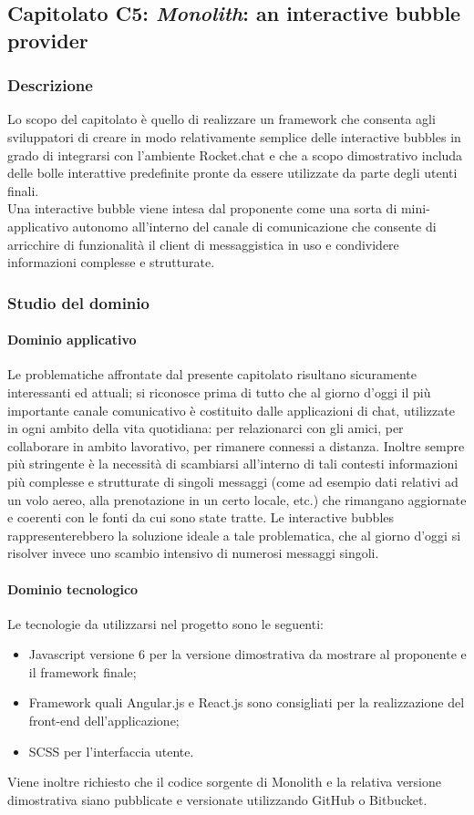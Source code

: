 	\subsection{Capitolato C5: \emph{Monolith}: an interactive bubble provider}
		\subsubsection{Descrizione}
		Lo scopo del capitolato è quello di realizzare un framework che consenta agli sviluppatori di creare in modo relativamente semplice delle 
		interactive bubbles in grado di integrarsi con l'ambiente Rocket.chat e che a scopo dimostrativo includa delle bolle interattive predefinite 
		pronte da essere utilizzate da parte degli utenti finali.
		\\Una interactive bubble viene intesa dal proponente come una sorta di mini-applicativo autonomo all'interno del canale di comunicazione 
		che consente di arricchire di funzionalità il client di messaggistica in uso e condividere informazioni complesse e strutturate.

		\subsubsection{Studio del dominio}
			\paragraph{Dominio applicativo}
			Le problematiche affrontate dal presente capitolato risultano sicuramente interessanti ed attuali; si riconosce prima di tutto che al 
			giorno d'oggi il più importante canale comunicativo è costituito dalle applicazioni di chat, utilizzate in ogni ambito della vita 
			quotidiana: per relazionarci con gli amici, per collaborare in ambito lavorativo, per rimanere connessi a distanza. Inoltre sempre 
			più stringente è la necessità di scambiarsi all'interno di tali contesti informazioni più complesse e strutturate di singoli messaggi 
			(come ad esempio dati relativi ad un volo aereo, alla prenotazione in un certo locale, etc.) che rimangano aggiornate e coerenti con 
			le fonti da cui sono state tratte. Le interactive bubbles rappresenterebbero la soluzione ideale a tale problematica, che al giorno 
			d'oggi si risolver invece uno scambio intensivo di numerosi messaggi singoli. 
			\paragraph{Dominio tecnologico}
			Le tecnologie da utilizzarsi nel progetto sono le seguenti:
			\begin{itemize}
				\item Javascript versione 6 per la versione dimostrativa da mostrare al proponente e il framework finale;
				\item Framework quali Angular.js e React.js sono consigliati per la realizzazione del front-end dell'applicazione;
				\item SCSS per l'interfaccia utente.
			\end{itemize}
			Viene inoltre richiesto che il codice sorgente di Monolith e la relativa versione dimostrativa siano pubblicate e versionate utilizzando 
			GitHub o Bitbucket.

